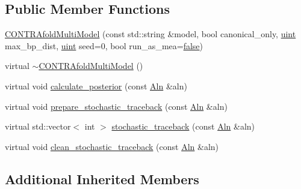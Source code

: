 \subsection*{Public Member Functions}
\begin{DoxyCompactItemize}
\item 
\hyperlink{class_c_o_n_t_r_afold_multi_model_aa81bb3911814e7ea1239cb796384a585}{C\+O\+N\+T\+R\+Afold\+Multi\+Model} (const std\+::string \&model, bool canonical\+\_\+only, \hyperlink{cyktable_8h_a91ad9478d81a7aaf2593e8d9c3d06a14}{uint} max\+\_\+bp\+\_\+dist, \hyperlink{cyktable_8h_a91ad9478d81a7aaf2593e8d9c3d06a14}{uint} seed=0, bool run\+\_\+as\+\_\+mea=\hyperlink{naview_8c_a65e9886d74aaee76545e83dd09011727}{false})
\item 
virtual \hyperlink{class_c_o_n_t_r_afold_multi_model_ac0e03008c02f2ebd3993ec4f576189dc}{$\sim$\+C\+O\+N\+T\+R\+Afold\+Multi\+Model} ()
\item 
virtual void \hyperlink{class_c_o_n_t_r_afold_multi_model_af408693a48cfcf28aca97853098e4111}{calculate\+\_\+posterior} (const \hyperlink{class_aln}{Aln} \&aln)
\item 
virtual void \hyperlink{class_c_o_n_t_r_afold_multi_model_acbfb06ede76be8e8b5709f62c5089b60}{prepare\+\_\+stochastic\+\_\+traceback} (const \hyperlink{class_aln}{Aln} \&aln)
\item 
virtual std\+::vector$<$ int $>$ \hyperlink{class_c_o_n_t_r_afold_multi_model_aace1a916ed70f69b6d8d852c69a1b549}{stochastic\+\_\+traceback} (const \hyperlink{class_aln}{Aln} \&aln)
\item 
virtual void \hyperlink{class_c_o_n_t_r_afold_multi_model_adc88dbc34243d5e0bd1c713a25cf5a34}{clean\+\_\+stochastic\+\_\+traceback} (const \hyperlink{class_aln}{Aln} \&aln)
\end{DoxyCompactItemize}
\subsection*{Additional Inherited Members}


